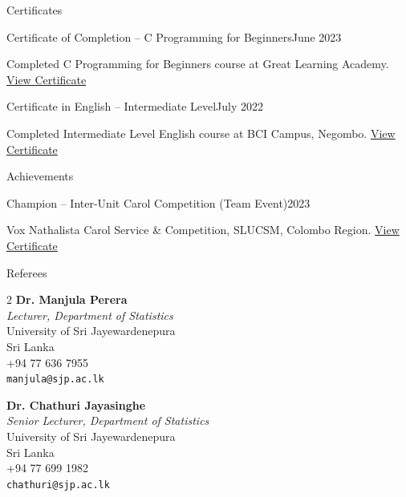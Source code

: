 \documentclass{resume} %
\begin{document}

\begin{rSection}{Certificates}

\begin{rSubsection}{Certificate of Completion – C Programming for Beginners}{June 2023}{}{}
\item Completed C Programming for Beginners course at Great Learning Academy.
\href{https://drive.google.com/file/d/17yBkDsDMljyqSySPbw4xm5KKSup34ilK/view}{View Certificate}
\end{rSubsection}

\begin{rSubsection}{Certificate in English – Intermediate Level}{July 2022}{}{}
\item Completed Intermediate Level English course at BCI Campus, Negombo.
\href{https://drive.google.com/file/d/1i6qYmFqPSjXAUdLu2JxqDj3YJeBDll6S/view}{View Certificate}
\end{rSubsection}

\end{rSection}


\begin{rSection}{Achievements} 

\begin{rSubsection}{Champion – Inter-Unit Carol Competition (Team Event)}{2023}{}{}
\item Vox Nathalista Carol Service \& Competition, SLUCSM,  Colombo Region.
\href{https://drive.google.com/file/d/1TiQX5Kn3mH6cxvPmqFG7c-65bgySLIHT/view}{View Certificate}
\end{rSubsection}

\end{rSection}



\begin{rSection}{Referees} 
\begin{multicols}{2}
\noindent
\textbf{Dr. Manjula Perera} \\
\textit{Lecturer, Department of Statistics} \\
University of Sri Jayewardenepura \\
Sri Lanka \\
+94 77 636 7955 \\
\texttt{manjula@sjp.ac.lk}

\columnbreak

\noindent
\textbf{Dr. Chathuri Jayasinghe} \\
\textit{Senior Lecturer, Department of Statistics} \\
University of Sri Jayewardenepura \\
Sri Lanka \\
+94 77 699 1982 \\
\texttt{chathuri@sjp.ac.lk}
\end{multicols}

\end{rSection}
\end{document}
